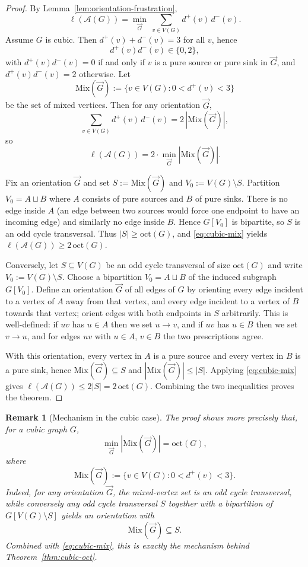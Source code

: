 \documentclass[11pt]{article}
\newtheorem{remark}{Remark}
\theoremstyle{plain}
\begin{document}
\begin{proof}
By Lemma~\ref{lem:orientation-frustration},
\[
\ell(\mathcal A(G))=\min_{\vec G}\ \sum_{v\in V(G)} d^+(v)\,d^-(v).
\]
Assume $G$ is cubic. Then $d^+(v)+d^-(v)=3$ for all $v$, hence
\[
d^+(v)d^-(v)\in\{0,2\},
\]
with $d^+(v)d^-(v)=0$ if and only if $v$ is a pure source or pure sink in $\vec G$, and
$d^+(v)d^-(v)=2$ otherwise. Let
\[
\mathrm{Mix}(\vec G):=\{v\in V(G): 0<d^+(v)<3\}
\]
be the set of mixed vertices. Then for any orientation $\vec G$,
\[
\sum_{v\in V(G)} d^+(v)\,d^-(v)=2\,|\mathrm{Mix}(\vec G)|,
\]
so
\begin{equation}\label{eq:cubic-mix}
\ell(\mathcal A(G))=2\cdot \min_{\vec G}|\mathrm{Mix}(\vec G)|.
\end{equation}

Fix an orientation $\vec G$ and set $S:=\mathrm{Mix}(\vec G)$ and $V_0:=V(G)\setminus S$.
Partition $V_0=A\sqcup B$ where $A$ consists of pure sources and $B$ of pure sinks.
There is no edge inside $A$ (an edge between two sources would force one endpoint to have
an incoming edge) and similarly no edge inside $B$. Hence $G[V_0]$ is bipartite, so $S$ is
an odd cycle transversal. Thus $|S|\ge \mathrm{oct}(G)$, and \eqref{eq:cubic-mix} yields
$\ell(\mathcal A(G))\ge 2\,\mathrm{oct}(G)$.

Conversely, let $S\subseteq V(G)$ be an odd cycle transversal of size $\mathrm{oct}(G)$ and
write $V_0:=V(G)\setminus S$. Choose a bipartition $V_0=A\sqcup B$ of the induced subgraph
$G[V_0]$. Define an orientation $\vec G$ of all edges of $G$ by orienting every edge
incident to a vertex of $A$ away from that vertex, and every edge incident to a vertex of
$B$ towards that vertex; orient edges with both endpoints in $S$ arbitrarily. This is
well-defined: if $uv$ has $u\in A$ then we set $u\to v$, and if $uv$ has $u\in B$ then we
set $v\to u$, and for edges $uv$ with $u\in A$, $v\in B$ the two prescriptions agree.

With this orientation, every vertex in $A$ is a pure source and every vertex in $B$ is a
pure sink, hence $\mathrm{Mix}(\vec G)\subseteq S$ and $|\mathrm{Mix}(\vec G)|\le|S|$.
Applying \eqref{eq:cubic-mix} gives $\ell(\mathcal A(G))\le 2|S|=2\,\mathrm{oct}(G)$.
Combining the two inequalities proves the theorem.
\end{proof}

\begin{remark}[Mechanism in the cubic case]
The proof shows more precisely that, for a cubic graph $G$,
\[
\min_{\vec G}|\mathrm{Mix}(\vec G)|=\mathrm{oct}(G),
\]
where
\[
\mathrm{Mix}(\vec G):=\{v\in V(G):0<d^+(v)<3\}.
\]
Indeed, for any orientation $\vec G$, the mixed-vertex set is an odd cycle
transversal, while conversely any odd cycle transversal $S$ together with a
bipartition of $G[V(G)\setminus S]$ yields an orientation with
\[
\mathrm{Mix}(\vec G)\subseteq S.
\]
Combined with \eqref{eq:cubic-mix}, this is exactly the mechanism behind
Theorem~\ref{thm:cubic-oct}.
\end{remark}
\end{document}
